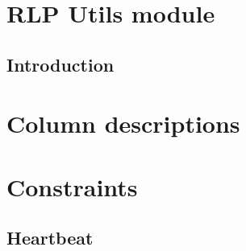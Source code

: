
\section{RLP Utils module}
\subsection{Introduction}                
\section{Column descriptions}            \label{rlputils: column descriptions}             

\section{Constraints}
\subsection{Heartbeat}                   